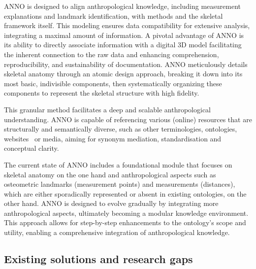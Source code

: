 \documentclass[sw]{iosart2x}
\begin{document}
ANNO is designed to align anthropological knowledge, including measurement explanations and landmark identification, with methods and the skeletal framework itself.
This modeling ensures data compatibility for extensive analysis, integrating a maximal amount of information.
A pivotal advantage of ANNO is its ability to directly associate information with a digital 3D model facilitating the inherent connection to the raw data and enhancing comprehension, reproducibility, and sustainability of documentation.
ANNO meticulously details skeletal anatomy through an atomic design approach, breaking it down into its most basic, indivisible components, then systematically organizing these components to represent the skeletal structure with high fidelity.

This granular method facilitates a deep and scalable anthropological understanding.
ANNO is capable of referencing various (online) resources that are structurally and semantically diverse, such as other terminologies, ontologies, websites~\citep{atinfo} or media, aiming for synonym mediation, standardisation and conceptual clarity.

The current state of ANNO includes a foundational module that focuses on skeletal anatomy on the one hand and anthropological aspects such as osteometric landmarks (measurement points) and measurements (distances),
which are either sporadically represented or absent in existing ontologies, on the other hand.
ANNO is designed to evolve gradually by integrating more anthropological aspects, ultimately becoming a modular knowledge environment.
This approach allows for step-by-step enhancements to the ontology's scope and utility, enabling a comprehensive integration of anthropological knowledge.

\subsection{Existing solutions and research gaps}\label{sec:Solutions+Gaps}
\end{document}

